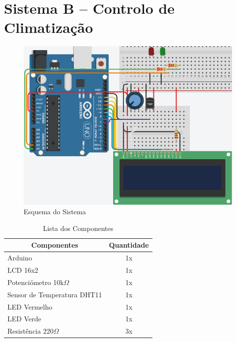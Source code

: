 \newpage
\section{Sistema B – Controlo de Climatização}


\begin{figure}[H]
    \includegraphics[scale=0.5]{images/hardware/sisB_tinkercad.png}
    \caption{Esquema do Sistema}
\end{figure}
\begin{table}[H]
    \centering
    \setlength{\arrayrulewidth}{0.5mm}
    \renewcommand{\arraystretch}{1.5}
    \begin{tabular}{|l|c|}
        \hline
        \multicolumn{1}{|c|}{Componentes} & \multicolumn{1}{|c|}{Quantidade}\\ [0.8ex] 
        \hline
        Arduino & 1x\\
        \hline
        LCD 16x2 & 1x\\
        \hline
        Potenciómetro 10k$\Omega$ & 1x\\
        \hline
        Sensor de Temperatura DHT11 & 1x\\
        \hline
        LED Vermelho & 1x\\
        \hline
        LED Verde & 1x\\
        \hline
        Resistência 220$\Omega$ & 3x\\
        \hline
    \end{tabular}
    \caption{Lista dos Componentes}
\end{table}

